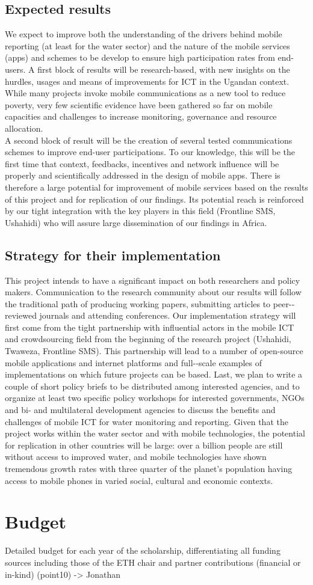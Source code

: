 \documentclass[11pt]{article}
\begin{document}
\subsection{Expected results}
We expect to improve both the understanding of the drivers behind mobile reporting (at least for the water sector) and the nature of the mobile services (apps) and schemes to be develop to ensure high participation rates from end-users. A first block of results will be research-based, with new insights on the hurdles, usages and means of improvements for ICT in the Ugandan context. While many projects invoke mobile communications as a new tool to reduce poverty, very few scientific evidence have been gathered so far on mobile capacities and challenges to increase monitoring, governance and resource allocation. 
\\
A second block of result will be the creation of several tested communications schemes to improve end-user participations. To our knowledge, this will be the first time that context, feedbacks, incentives and network influence will be properly and scientifically addressed in the design of mobile apps. There is therefore a large potential for improvement of mobile services based on the results of this project and for replication of our findings. Its potential reach is reinforced by our tight integration with the key players in this field (Frontline SMS, Ushahidi) who will assure large dissemination of our findings in Africa.
\subsection{Strategy for their implementation}
This project intends to have a significant impact on both researchers and policy makers. Communication to the research community about our results will follow the traditional path of producing working papers, submitting articles to peer-­reviewed journals and attending conferences. Our implementation strategy will first come from the tight partnership with influential actors in the mobile ICT and crowdsourcing field from the beginning of the research project (Ushahidi, Twaweza, Frontline SMS). This partnership will lead to a number of open-­source mobile applications and internet platforms and full-­‐scale examples of implementations on which future projects can be based. Last, we plan to write a couple of short policy briefs to be distributed among interested agencies, and to organize at least two specific policy workshops for interested governments, NGOs and bi-­ and multilateral development agencies to discuss the benefits and challenges of mobile ICT for water monitoring and reporting. Given that the project works within the water sector and with mobile technologies, the potential for replication in other countries will be large: over a billion people are still without access to improved water, and mobile technologies have shown tremendous growth rates with three quarter of the planet’s population having access to mobile phones in varied social, cultural and economic contexts.

\section{Budget}

Detailed budget for each year of the scholarship, differentiating all funding sources including those of the ETH chair and partner contributions (financial or in-kind) (point10) -> Jonathan




\end{document}
